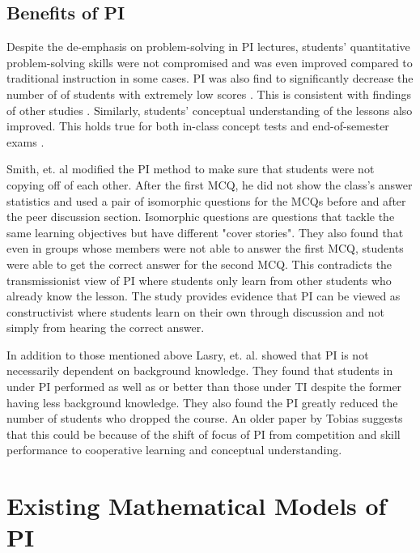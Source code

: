 \documentclass[twocolumn,secnumarabic,amssymb, nobibnotes, aps, prd]{revtex4-2}
\begin{document}
    \subsection{Benefits of PI}

    Despite the de-emphasis on problem-solving in PI lectures, students' quantitative problem-solving skills were not compromised and was even improved compared to traditional instruction in some cases.
    PI was also find to significantly decrease the number of of students with extremely low scores \cite{crouch2001peer}.
    This is consistent with findings of other studies \cite{lasry2008peer,thacker1994comparing}.
    Similarly, students' conceptual understanding of the lessons also improved.
    This holds true for both in-class concept tests and end-of-semester exams \cite{crouch2001peer}.

    Smith, et. al \cite{smith2009peer} modified the PI method to make sure that students were not copying off of each other. After the first MCQ, he did not show the class's answer statistics and used a pair of isomorphic questions for the MCQs before and after the peer discussion section. Isomorphic questions are questions that tackle the same learning objectives but have different "cover stories".
    They also found that even in groups whose members were not able to answer the first MCQ, students were able to get the correct answer for the second MCQ.
    This contradicts the transmissionist view of PI where students only learn from other students who already know the lesson.
    The study provides evidence that PI can be viewed as constructivist where students learn on their own through discussion and not simply from hearing the correct answer.

    In addition to those mentioned above Lasry, et. al. \cite{lasry2008peer} showed that PI is not necessarily dependent on background knowledge. They found that students in under PI performed as well as or better than those under TI despite the former having less background knowledge.
    They also found the PI greatly reduced the number of students who dropped the course.
    An older paper by Tobias \cite{tobias1990they} suggests that this could be because of the shift of focus of PI from competition and skill performance to cooperative learning and conceptual understanding.


\section{Existing Mathematical Models of PI}
\end{document}
